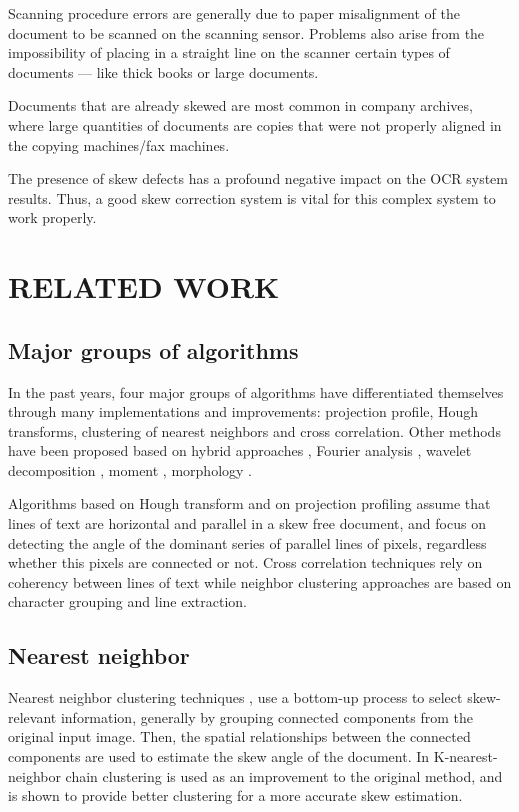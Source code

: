 \documentclass[10pt,a4paper]{article}
\begin{document}
	Scanning procedure errors are generally due to paper misalignment of the document to be scanned on the scanning sensor. Problems also arise from the impossibility of placing in a straight line on the scanner certain types of documents — like thick books or large documents.
	
	Documents that are already skewed are most common in company archives, where large quantities of documents are copies that were not properly aligned in the copying machines/fax machines.
	
	The presence of skew defects has a profound negative impact on the OCR system results. Thus, a good skew correction system is vital for this complex system to work properly.
	
	\section{RELATED WORK}
	\subsection{Major groups of algorithms}
	In the past years, four major groups of algorithms have differentiated themselves through many implementations and improvements: projection profile, Hough transforms, clustering of nearest neighbors and cross correlation. Other methods have been proposed based on hybrid approaches \cite{hybrid}, Fourier analysis \cite{fourier}, wavelet decomposition \cite{wavelet}, moment \cite{moment}, morphology \cite{morphology}.
	
	Algorithms based on Hough transform \cite{hough} and on projection profiling \cite{proj} assume that lines of text are horizontal and parallel in a skew free document, and focus on detecting the angle of the dominant series of parallel lines of pixels, regardless whether this pixels are connected or not. Cross correlation techniques \cite{cross} rely on coherency between lines of text while neighbor clustering approaches are based on character grouping and line extraction.
	
	\subsection{Nearest neighbor}
	Nearest neighbor clustering techniques \cite{neighbor}, use a bottom-up process to select skew-relevant information, generally by grouping connected components from the original input image. Then, the spatial relationships between the connected components are used to estimate the skew angle of the document. In \cite{neighbor_chain} K-nearest-neighbor chain clustering is used as an improvement to the original method, and is shown to provide better clustering for a more accurate skew estimation.
	
\end{document}
